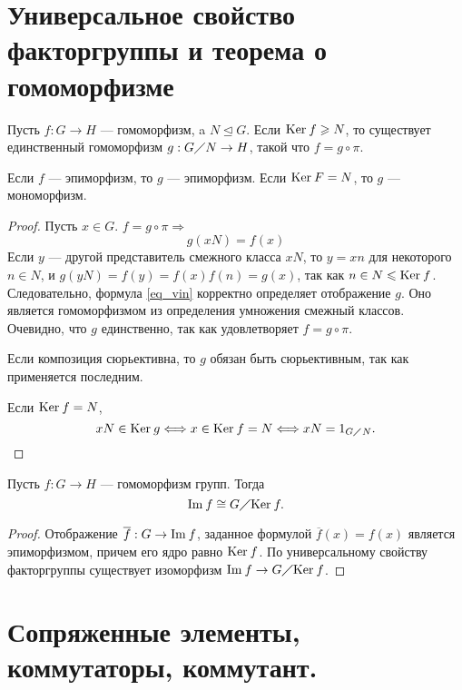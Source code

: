 \documentclass[11pt]{book}
\newcommand{\po}{\diagup}
\renewcommand{\le}{\leqslant}
\renewcommand{\ge}{\geqslant}
\newcommand{\im}{{\mathop{\text{\rm Im}}}\:}
\renewcommand{\ker}{{\mathop{\text{\rm Ker}}}\:}
\theoremstyle{definition}
\theoremstyle{plain}
\theoremstyle{plain}
\theoremstyle{definition}
\theoremstyle{remark}
\begin{document}
\section{Универсальное свойство факторгруппы и теорема о гомоморфизме}
\begin{thm}
    Пусть
    $f : G \to H$ --- гомоморфизм, a $N\trianglelefteq G$. Если $ \ker f \ge N$, то существует единственный гомоморфизм $ g: G\diagup N \to  H$, такой что $ f = g \circ \pi$.

    Если $ f$ --- эпиморфизм, то $ g$ --- эпиморфизм. Если $ \ker F = N$, то $ g$  --- мономорфизм.
\end{thm}
\begin{proof}
    Пусть $ x \in G$. $f = g \circ \pi \Longrightarrow $
    \begin{equation}\label{eq_vin}
	g(xN) = f(x)
    \end{equation}
    Если $ y$ --- другой представитель смежного класса  $ xN$, то  $ y = xn$ для некоторого  $ n \in N$, и $ g(yN) = f(y) = f(x)f(n) = g(x)$, так как $ n \in N \le \ker f$. Следовательно, формула \ref{eq_vin} корректно определяет отображение $ g$. Оно является гомоморфизмом из определения умножения смежный классов. Очевидно, что  $ g$ единственно, так как удовлетворяет  $ f =g \circ \pi$.

    Если композиция сюрьективна, то $ g$ обязан быть сюрьективным,  так как применяется последним.

    Если  $ \ker f = N$,
    \[
	xN \in \ker g \Longleftrightarrow x \in \ker f = N \Longleftrightarrow x N = 1_{G \po N}
    .\]
\end{proof}
\begin{thm}
    Пусть $ f: G \to H$ --- гомоморфизм групп. Тогда \[
	\im f \cong G \po \ker f
    .\]
\end{thm}
\begin{proof}
    Отображение $ \overline{f}: G \to \im f$, заданное формулой $ \overline{f}(x) = f(x)$ является эпиморфизмом, причем его ядро равно $ \ker f$. По универсальному свойству факторгруппы существует изоморфизм $ \im f \to  G \po \ker f$.
\end{proof}
\section{Сопряженные элементы, коммутаторы, коммутант.}
\end{document}
